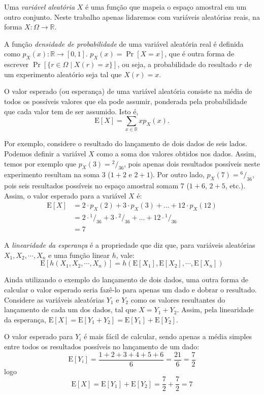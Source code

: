 Uma \emph{variável aleatória} $X$ é uma função que mapeia o espaço amostral em um outro conjunto. Neste trabalho apenas lidaremos com variáveis aleatórias reais, na forma $X : \Omega \to \mathbb{R}$. 

A função \emph{densidade de probabilidade} de uma variável aleatória real é definida como $p_X(x) : \mathbb{R} \to [0, 1]$. $p_X(x) = \Pr[X = x]$, que é outra forma de escrever $\Pr[\{r \in \Omega \mid X(r) = x\}]$, ou seja, a probabilidade do resultado $r$ de um experimento aleatório seja tal que $X(r) = x$.

O valor esperado (ou esperança) de uma variável aleatória consiste na média de todos os possíveis valores que ela pode assumir, ponderada pela probabilidade que cada valor tem de ser assumido. Isto é,
\[
    \text{E}[X] = \sum_{x \in \mathbb{R}} x p_X(x).
\]

Por exemplo, considere o resultado do lançamento de dois dados de seis lados. Podemos definir a variável $X$ como a soma dos valores obtidos nos dados. Assim, temos por exemplo que $p_X(3) = {^2/_{36}}$, pois apenas dois resultados possíveis neste experimento resultam na soma 3 ($1+2$ e $2+1$). Por outro lado, $p_X(7) = {^6/_{36}}$, pois seis resultados possíveis no espaço amostral somam 7 ($1+6$, $2+5$, etc.). Assim, o valor esperado para a variável $X$ é:
\begin{align*}
    \text{E}[X] &= 2 \cdot p_X(2) + 3 \cdot p_X(3) + ... + 12 \cdot p_X(12) \\
          &= 2 \cdot {^1/_{36}} + 3 \cdot {^2/_{36}} + ... + 12 \cdot {^1/_{36}} \\
          &= 7
\end{align*}

A \emph{linearidade da esperança} é a propriedade que diz que, para variáveis aleatórias $X_1, X_2, \cdots, X_n$ e uma função linear $h$, vale:
\[
    \text{E}[h(X_1, X_2, \cdots, X_n)] = h(\text{E}[X_1], \text{E}[X_2], \cdots, \text{E}[X_n])
\]

Ainda utilizando o exemplo do lançamento de dois dados, uma outra forma de calcular o valor esperado seria fazê-lo para apenas um dado e dobrar o resultado. Considere as variáveis aleatórias $Y_1$ e $Y_2$ como os valores resultantes do lançamento de cada um dos dados, tal que $X = Y_1 + Y_2$. Assim, pela linearidade da esperança, $\text{E}[X] = \text{E}[Y_1 + Y_2] = \text{E}[Y_1] + \text{E}[Y_2]$. 

O valor esperado para $Y_i$ é mais fácil de calcular, sendo apenas a média simples entre todos os resultados possíveis no lançamento de um dado:
\[
    \text{E}[Y_i] = \frac{1+2+3+4+5+6}{6} = \frac{21}{6} = \frac{7}{2}
\]
logo
\[
    \text{E}[X] = \text{E}[Y_1] + \text{E}[Y_2]  = \frac{7}{2} + \frac{7}{2} = 7
\]

